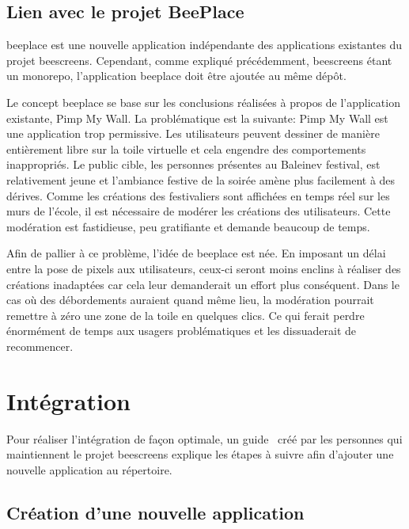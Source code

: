 \subsection{Lien avec le projet BeePlace}
\label{sec:lien-avec-le-projet-beeplace}

\gls{beeplace} est une nouvelle application indépendante des applications existantes du projet \gls{beescreens}. Cependant, comme expliqué précédemment, \gls{beescreens} étant un monorepo, l'application \gls{beeplace} doit être ajoutée au même dépôt.

Le concept \gls{beeplace} se base sur les conclusions réalisées à propos de l'application existante, Pimp My Wall. La problématique est la suivante: Pimp My Wall est une application trop permissive. Les utilisateurs peuvent dessiner de manière entièrement libre sur la toile virtuelle et cela engendre des comportements inappropriés. Le public cible, les personnes présentes au Baleinev festival, est relativement jeune et l'ambiance festive de la soirée amène plus facilement à des dérives. Comme les créations des festivaliers sont affichées en temps réel sur les murs de l'école, il est nécessaire de modérer les créations des utilisateurs. Cette modération est fastidieuse, peu gratifiante et demande beaucoup de temps.

Afin de pallier à ce problème, l'idée de \gls{beeplace} est née. En imposant un délai entre la pose de pixels aux utilisateurs, ceux-ci seront moins enclins à réaliser des créations inadaptées car cela leur demanderait un effort plus conséquent. Dans le cas où des débordements auraient quand même lieu, la modération pourrait remettre à zéro une zone de la toile en quelques clics. Ce qui ferait perdre énormément de temps aux usagers problématiques et les dissuaderait de recommencer.

\section{Intégration}

Pour réaliser l'intégration de façon optimale, un guide~\cite{addapptobeescreens} créé par les personnes qui maintiennent le projet \gls{beescreens} explique les étapes à suivre afin d'ajouter une nouvelle application au répertoire.

\subsection{Création d'une nouvelle application}

